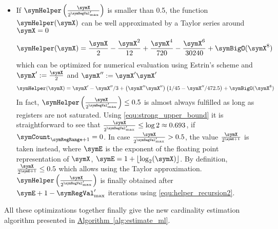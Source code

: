 \documentclass[11pt]{article} %
\newcommand*{\algoref}[1]{\hyperref[#1]{Algorithm~\ref*{#1}}}
\begin{document}
\begin{itemize}
\item If $\symHelper\left(\frac{\symX}{2^{\symRegVal'_\text{max}}}\right)$ is smaller than 0.5, the function $\symHelper(\symX)$ can be well approximated by a Taylor series around $\symX=0$
\begin{equation}
\symHelper(\symX)
=
\frac{\symX}{2} - \frac{\symX^2}{12} +\frac{\symX^4}{720}-\frac{\symX^6}{30240} + \symBigO(\symX^{8})
\end{equation}
which can be optimized for numerical evaluation using Estrin's scheme and $\symX' := \frac{\symX}{2}$ and $\symX'' := \symX' \symX'$
\begin{equation}
\label{equ:taylor}
\symHelper(\symX)
=
\symX' - \symX''/3 + \left(\symX'' \symX''\right)\left(1/45-\symX''/472.5\right)
+ \symBigO(\symX^{8})
\end{equation}
In fact, $\symHelper\left(\frac{\symX}{2^{\symRegVal'_\text{max}}}\right)\leq 0.5$ is almost always fulfilled as long as registers are not saturated. Using \eqref{equ:strong_upper_bound} it is straightforward to see that $\frac{\symX}{2^{\symRegVal'_\text{max}}} \leq \log 2 \approx 0.693$, if $\symCount_{\symRegRange+1}=0$.
In case $\frac{\symX}{2^{\symRegVal'_\text{max}}} > 0.5$, the value $\frac{\symX}{2^{\symE+1}}$ is taken instead, where $\symE$ is the exponent of the floating point representation of $\symX$, $\symE = 1+\lfloor\log_2(\symX)\rfloor$. By definition, $\frac{\symX}{2^{\symE+1}}\leq 0.5$ which allows using the Taylor approximation. $\symHelper\left(\frac{\symX}{2^{\symRegVal'_\text{max}}}\right)$ is finally obtained after $\symE + 1 -\symRegVal'_\text{max}$ iterations using \eqref{equ:helper_recursion2}.
\end{itemize}

All these optimizations together finally give the new cardinality estimation algorithm presented in \algoref{alg:estimate_ml}.
\end{document}
